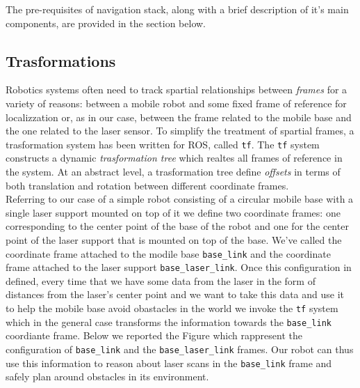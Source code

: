 The pre-requisites of navigation stack, along with a brief description of it's main 
components, are provided in the section below.
\subsection*{Trasformations}
Robotics systems often need to track spartial relationships between \textit{frames}
for a variety of reasons: between a mobile robot and some fixed frame of reference 
for localizzation or, as in our case, between the frame related to the mobile base 
and the one related to the laser sensor. To simplify the treatment of spartial frames,
a trasformation system has been written for ROS, called \texttt{tf}. The \texttt{tf} system 
constructs a dynamic \textit{trasformation tree} which realtes all frames of reference 
in the system. At an abstract level, a trasformation tree define \textit{offsets}
in terms of both translation and rotation between different coordinate frames.
\\
Referring to our case of a simple robot consisting of a circular mobile base
with a single laser support mounted on top of it we define two coordinate
frames: one corresponding to the center point of the base of the robot and one
for the center point of the laser support that is mounted on top of the base.
We've called the coordinate frame attached to the modile base \texttt{base\_link}
and the coordinate frame attached to the laser support \texttt{base\_laser\_link}.
Once this configuration in defined, every time that we have some data from the laser 
in the form of distances from the laser's center point and we want to take this data 
and use it to help the mobile base avoid obastacles in the world we invoke the \texttt{tf}
system which in the general case transforms the information towards the \texttt{base\_link}
coordiante frame. Below we reported the Figure which rappresent the configuration of 
\texttt{base\_link} and the \texttt{base\_laser\_link} frames.
Our robot can thus use this information to reason about laser scans in
the \texttt{base\_link} frame and safely plan around obstacles in its environment.

